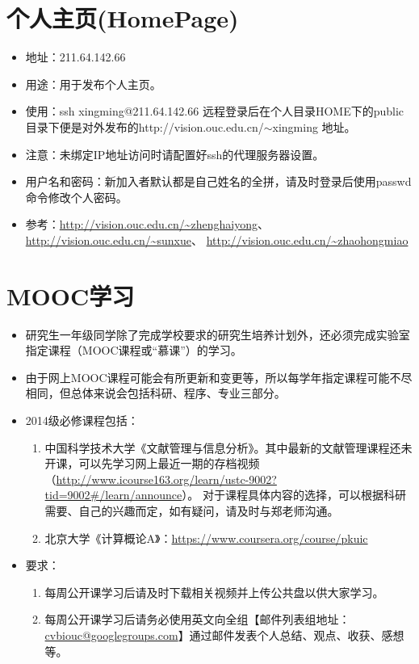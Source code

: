 \documentclass[a4paper，12pt]{article}
\begin{document}
\section{个人主页(HomePage)}

\begin{itemize}
\item 地址：211.64.142.66
\item 用途：用于发布个人主页。
\item 使用：ssh xingming@211.64.142.66 远程登录后在个人目录HOME下的public目录下便是对外发布的http://vision.ouc.edu.cn/$\sim$xingming 地址。
\item 注意：未绑定IP地址访问时请配置好ssh的代理服务器设置。
\item 用户名和密码：新加入者默认都是自己姓名的全拼，请及时登录后使用passwd命令修改个人密码。
\item 参考：\url{http://vision.ouc.edu.cn/~zhenghaiyong}、 \url{http://vision.ouc.edu.cn/~sunxue}、 \url{http://vision.ouc.edu.cn/~zhaohongmiao}
\end{itemize}

\section{MOOC学习}

\begin{itemize}
\item 研究生一年级同学除了完成学校要求的研究生培养计划外，还必须完成实验室指定课程（MOOC课程或“慕课”）的学习。
\item 由于网上MOOC课程可能会有所更新和变更等，所以每学年指定课程可能不尽相同，但总体来说会包括科研、程序、专业三部分。
\item 2014级必修课程包括：

\begin{enumerate}
\item 中国科学技术大学《文献管理与信息分析》。其中最新的文献管理课程还未开课，可以先学习网上最近一期的存档视频（\url{http://www.icourse163.org/learn/ustc-9002?tid=9002#/learn/announce}）。
对于课程具体内容的选择，可以根据科研需要、自己的兴趣而定，如有疑问，请及时与郑老师沟通。
\item 北京大学《计算概论A》：\url{https://www.coursera.org/course/pkuic}
\end{enumerate}

\item 要求：

\begin{enumerate}
\item 每周公开课学习后请及时下载相关视频并上传公共盘以供大家学习。
\item 每周公开课学习后请务必使用英文向全组【邮件列表组地址：\href{mailto:zhenglabouc@googlegroups.com}{cvbiouc@googlegroups.com}】通过邮件发表个人总结、观点、收获、感想等。
\end{enumerate}

\end{itemize}
\end{document}
